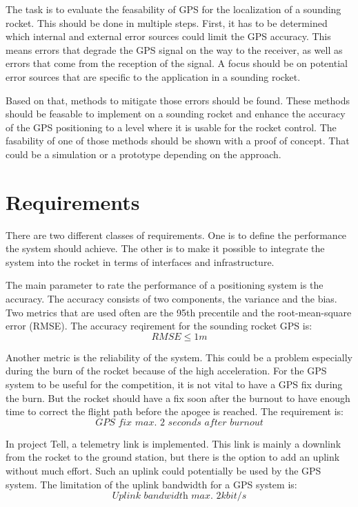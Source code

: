 The task is to evaluate the feasability of GPS for the localization of a sounding rocket.
This should be done in multiple steps.
First, it has to be determined which internal and external error sources could limit the GPS accuracy.
This means errors that degrade the GPS signal on the way to the receiver, as well as errors that come from the reception of the signal.
A focus should be on potential error sources that are specific to the application in a sounding rocket.

Based on that, methods to mitigate those errors should be found.
These methods should be feasable to implement on a sounding rocket and enhance the accuracy of the GPS positioning to a level where it is usable for the rocket control.
The fasability of one of those methods should be shown with a proof of concept.
That could be a simulation or a prototype depending on the approach.


\section{Requirements}\label{sec:requirements}

There are two different classes of requirements.
One is to define the performance the system should achieve.
The other is to make it possible to integrate the system into the rocket in terms of interfaces and infrastructure.

The main parameter to rate the performance of a positioning system is the accuracy.
The accuracy consists of two components, the variance and the bias.
Two metrics that are used often are the 95th precentile and the root-mean-square error (RMSE).
The accuracy reqirement for the sounding rocket GPS is:
$$ RMSE \le 1m $$

Another metric is the reliability of the system.
This could be a problem especially during the burn of the rocket because of the high acceleration.
For the GPS system to be useful for the competition, it is not vital to have a GPS fix during the burn.
But the rocket should have a fix soon after the burnout to have enough time to correct the flight path before the apogee is reached.
The requirement is:
$$ \textit{GPS fix max. 2 seconds after burnout} $$

In project Tell, a telemetry link is implemented.
This link is mainly a downlink from the rocket to the ground station, but there is the option to add an uplink without much effort.
Such an uplink could potentially be used by the GPS system.
The limitation of the uplink bandwidth for a GPS system is:
$$ \textit{Uplink bandwidth max. 2kbit/s} $$